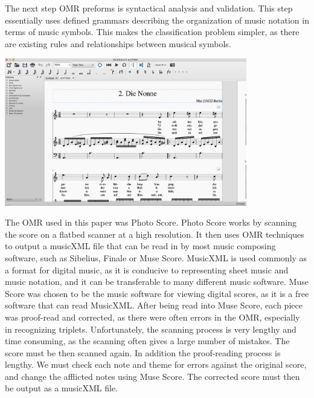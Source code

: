 \documentclass[12pt,twoside]{reedthesis}
\theoremstyle{definition}
\theoremstyle{definition}
\theoremstyle{definition}
\theoremstyle{remark}
\begin{document}
The next step OMR preforms is syntactical analysis and validation. This
step essentially uses defined grammars describing the organization of
music notation in terms of music symbols. This makes the classification
problem simpler, as there are existing rules and relationships between
musical symbols.
\begin{Shaded}
\begin{Highlighting}[]
\OperatorTok{::}\NormalTok{(}\NormalTok{)}
\end{Highlighting}
\end{Shaded}
\includegraphics[width=400px]{images/museScore}

The OMR used in this paper was Photo Score. Photo Score works by
scanning the score on a flatbed scanner at a high resolution. It then
uses OMR techniques to output a musicXML file that can be read in by
most music composing software, such as Sibelius, Finale or Muse Score.
MusicXML is used commonly as a format for digital music, as it is
conducive to representing sheet music and music notation, and it can be
transferable to many different music software. Muse Score was chosen to
be the music software for viewing digital scores, as it is a free
software that can read MusicXML. After being read into Muse Score, each
piece was proof-read and corrected, as there were often errors in the
OMR, especially in recognizing triplets. Unfortunately, the scanning
process is very lengthy and time consuming, as the scanning often gives
a large number of mistakes. The score must be then scanned again. In
addition the proof-reading process is lengthy. We must check each note
and theme for errors against the original score, and change the
afflicted notes using Muse Score. The corrected score must then be
output as a musicXML file.
\end{document}
